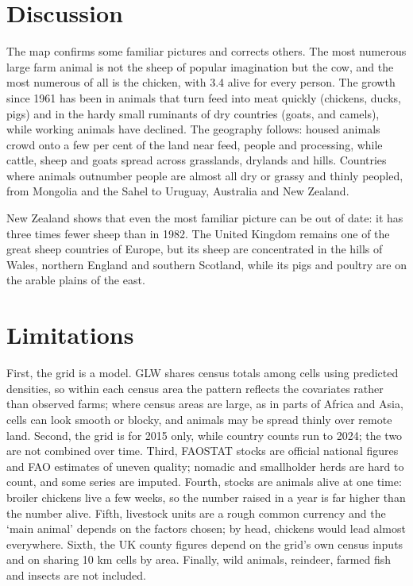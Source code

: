 \documentclass[11pt,a4paper]{article}
\begin{document}
\section{Discussion}
The map confirms some familiar pictures and corrects others. The most numerous large farm animal is not the sheep of popular imagination but the cow, and the most numerous of all is the chicken, with 3.4 alive for every person. The growth since 1961 has been in animals that turn feed into meat quickly (chickens, ducks, pigs) and in the hardy small ruminants of dry countries (goats, and camels), while working animals have declined. The geography follows: housed animals crowd onto a few per cent of the land near feed, people and processing, while cattle, sheep and goats spread across grasslands, drylands and hills. Countries where animals outnumber people are almost all dry or grassy and thinly peopled, from Mongolia and the Sahel to Uruguay, Australia and New Zealand.

New Zealand shows that even the most familiar picture can be out of date: it has three times fewer sheep than in 1982. The United Kingdom remains one of the great sheep countries of Europe, but its sheep are concentrated in the hills of Wales, northern England and southern Scotland, while its pigs and poultry are on the arable plains of the east.

\section{Limitations}
First, the grid is a model. GLW shares census totals among cells using predicted densities, so within each census area the pattern reflects the covariates rather than observed farms; where census areas are large, as in parts of Africa and Asia, cells can look smooth or blocky, and animals may be spread thinly over remote land. Second, the grid is for 2015 only, while country counts run to 2024; the two are not combined over time. Third, FAOSTAT stocks are official national figures and FAO estimates of uneven quality; nomadic and smallholder herds are hard to count, and some series are imputed. Fourth, stocks are animals alive at one time: broiler chickens live a few weeks, so the number raised in a year is far higher than the number alive. Fifth, livestock units are a rough common currency and the `main animal' depends on the factors chosen; by head, chickens would lead almost everywhere. Sixth, the UK county figures depend on the grid's own census inputs and on sharing 10 km cells by area. Finally, wild animals, reindeer, farmed fish and insects are not included.
\end{document}

